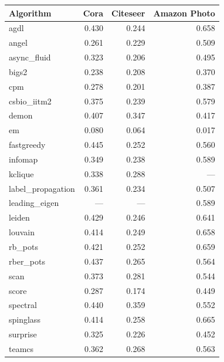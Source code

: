 \small
\begin{tabular}{lrrr}
\toprule
\textbf{Algorithm} & \textbf{Cora} & \textbf{Citeseer} & \textbf{Amazon Photo} \\
\midrule
agdl & 0.430 & 0.244 & 0.658 \\
angel & 0.261 & 0.229 & 0.509 \\
async\_fluid & 0.323 & 0.206 & 0.495 \\
bigs2 & 0.238 & 0.208 & 0.370 \\
cpm & 0.278 & 0.201 & 0.387 \\
csbio\_iitm2 & 0.375 & 0.239 & 0.579 \\
demon & 0.407 & 0.347 & 0.417 \\
em & 0.080 & 0.064 & 0.017 \\
fastgreedy & 0.445 & 0.252 & 0.560 \\
infomap & 0.349 & 0.238 & 0.589 \\
kclique & 0.338 & 0.288 & --- \\
label\_propagation & 0.361 & 0.234 & 0.507 \\
leading\_eigen & --- & --- & 0.589 \\
leiden & 0.429 & 0.246 & 0.641 \\
louvain & 0.414 & 0.249 & 0.658 \\
rb\_pots & 0.421 & 0.252 & 0.659 \\
rber\_pots & 0.437 & 0.265 & 0.564 \\
scan & 0.373 & 0.281 & 0.544 \\
score & 0.287 & 0.174 & 0.449 \\
spectral & 0.440 & 0.359 & 0.552 \\
spinglass & 0.414 & 0.258 & 0.665 \\
surprise & 0.325 & 0.226 & 0.452 \\
teamcs & 0.362 & 0.268 & 0.563 \\
\bottomrule
\end{tabular}
\normalsize